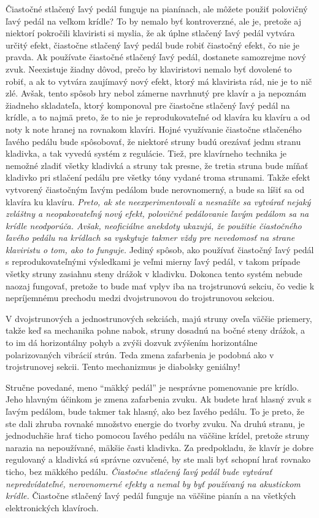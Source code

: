 Čiastočné stlačený ľavý pedál funguje na pianínach, ale môžete použiť polovičný ľavý pedál na veľkom krídle? To by nemalo byť kontroverzné, ale je, pretože aj niektorí pokročili klaviristi si myslia, že ak úplne stlačený ľavý pedál vytvára určitý efekt, čiastočne stlačený ľavý pedál bude robiť čiastočný efekt, čo nie je pravda. Ak používate čiastočné stlačený ľavý pedál, dostanete samozrejme nový zvuk. Neexistuje žiadny dôvod, prečo by klaviristovi nemalo byť dovolené to robiť, a ak to vytvára zaujímavý nový efekt, ktorý má klavirista rád, nie je to nič zlé. Avšak, tento spôsob hry nebol zámerne navrhnutý pre klavír a ja nepoznám žiadneho skladateľa, ktorý komponoval pre čiastočne  stlačený ľavý pedál na krídle, a to najmä preto, že to nie je reprodukovateľné od klavíra ku klavíru a od noty k note hranej na rovnakom klavíri. Hojné využívanie čiastočne stlačeného ľavého pedálu bude spôsobovať, že niektoré struny budú orezávať jednu stranu kladivka, a tak vyvedú systém z regulácie. Tiež, pre klavírneho technika je nemožné zladiť všetky kladivká a struny tak presne, že tretia struna bude míňať kladivko pri stlačení pedálu pre všetky tóny vydané troma strunami. Takže efekt vytvorený čiastočným ľavým pedálom bude nerovnomerný, a bude sa líšiť sa od klavíra ku  klavíru. \emph{Preto, ak ste neexperimentovali a nesnažíte sa vytvárať nejaký zvláštny a neopakovateľný nový efekt, polovičné pedálovanie ľavým pedálom sa na krídle neodporúča. Avšak,  neoficiálne anekdoty ukazujú, že použitie čiastočného ľavého pedálu na krídlach sa vyskytuje takmer vždy pre nevedomosť na strane klaviristu o tom, ako to funguje.} Jediný spôsob, ako používať čiastočný ľavý pedál s reprodukovateľnými výsledkami je veľmi mierny ľavý pedál, v takom prípade všetky struny zasiahnu steny drážok v kladivku. Dokonca tento systém nebude naozaj fungovať, pretože to bude mať vplyv iba na trojstrunovú sekciu, čo vedie k nepríjemnému prechodu medzi dvojstrunovou do trojstrunovou sekciou.

V dvojstrunových a jednostrunových sekciách, majú struny oveľa väčšie priemery, takže keď sa mechanika  pohne nabok, struny dosadnú na bočné steny drážok, a to im dá horizontálny pohyb a zvýši dozvuk zvýšením horizontálne polarizovaných vibrácií strún. Teda zmena zafarbenia je podobná ako v trojstrunovej sekcii. Tento mechanizmus je diabolsky geniálny!

Stručne povedané, meno “mäkký pedál” je nesprávne pomenovanie pre krídlo. Jeho hlavným účinkom je zmena zafarbenia zvuku. Ak budete hrať hlasný zvuk s ľavým pedálom, bude takmer tak hlasný, ako bez ľavého pedálu. To je preto, že ste dali zhruba rovnaké množstvo energie do tvorby zvuku. Na druhú stranu, je jednoduchšie hrať ticho pomocou ľavého pedálu na väčšine krídel, pretože struny narazia na nepoužívané, mäkšie časti kladivka. Za predpokladu, že klavír je dobre regulovaný a kladivká sú správne ozvučené, by ste mali byť schopní hrať rovnako ticho, bez mäkkého pedálu. \emph{Čiastočne stlačený ľavý pedál bude vytvárať nepredvídateľné, nerovnomerné efekty a nemal by byť používaný na akustickom krídle.} Čiastočne stlačený ľavý pedál funguje na väčšine pianín a na všetkých elektronických klavíroch.

